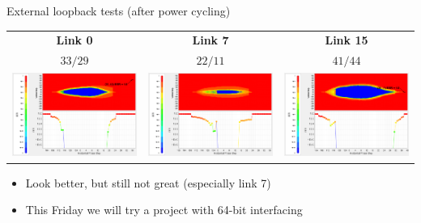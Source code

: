 \documentclass[aspectratio=169]{beamer}
\begin{document}
\begin{frame}{External loopback tests (after power cycling)}
\centering

	\vspace{.375cm}

	\begin{tabular}{c c c}
	\textbf{Link 0} & \textbf{Link 7} & \textbf{Link 15} \\[.25cm]
		$33 / 29$ & $22 / 11$ & $41 / 44$ \\[.25cm]
		\includegraphics[width=.3\textwidth]{fig/2021-02-15_10g_prbs7_link0_powercycle.png} &
		\includegraphics[width=.3\textwidth]{fig/2021-02-15_10g_prbs7_link7_powercycle.png} &
		\includegraphics[width=.3\textwidth]{fig/2021-02-15_10g_prbs7_link15_powercycle.png}
	\end{tabular}
		
	\vspace{.25cm}
	
	\begin{itemize}
		\item Look better, but still not great (especially link 7)
		\item This Friday we will try a project with 64-bit interfacing
	\end{itemize}

\end{frame}
\end{document}
